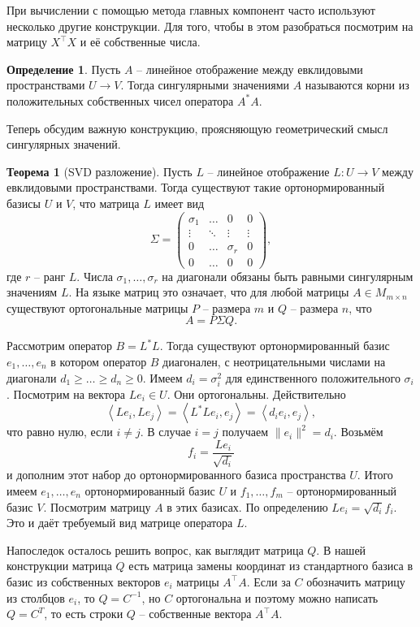 \documentclass[10pt,a4paper,oneside]{book}
\theoremstyle{definition}
\newtheorem*{defn}{\color{yellow!30!red} Определение}
\newtheorem{thm}{\color{red!40!black}Теорема}
\renewcommand{\geq}{\geqslant}
\def\lan{\left\langle }
\def\ran{\right\rangle}
\def\thrm{\begin{thm}}
\def\ethrm{\end{thm}}
\def\dfn{\begin{defn}}
\def\edfn{\end{defn}}
\def\pmat{\begin{pmatrix}}
\def\epmat{\end{pmatrix}}
\begin{document}
При вычислении с помощью метода главных компонент часто используют несколько другие конструкции. Для того, чтобы в этом разобраться посмотрим на матрицу  $X^{\top}X$  и её собственные числа.  

\dfn Пусть $A$ -- линейное отображение между евклидовыми пространствами $U \to V$. Тогда сингулярными значениями $A$ называются корни из положительных собственных чисел оператора $A^*A$.
\edfn



Теперь обсудим важную конструкцию, проясняющую геометрический смысл сингулярных значений.


\thrm[SVD разложение] Пусть $L$ -- линейное отображение $L\colon U \to V$ между евклидовыми пространствами. Тогда существуют такие ортонормированный базисы $U$ и $V$, что матрица $L$ имеет вид 
$$\Sigma=\pmat \sigma_1 &\dots& 0 & 0\\
 \vdots & \ddots &\vdots & \vdots\\
 0 & \dots & \sigma_r & 0\\
 0 &  \dots & 0 & 0 \epmat,$$
 где $r$ -- ранг $L$. Числа $\sigma_1, \dots, \sigma_r$ на диагонали обязаны быть равными сингулярным значениям $L$.
На языке матриц это означает, что для любой матрицы $A \in M_{m\times n}$ существуют ортогональные матрицы  $P$ -- размера $m$ и $Q$ -- размера $n$,  что
$$A= P \Sigma Q.$$
 
\proof Рассмотрим оператор $B = L^{*}L$. Тогда существуют ортонормированный базис $e_1,\dots,e_n$ в котором оператор $B$ диагонален, с неотрицательными числами на диагонали $d_1\geq\dots\geq d_n\geq 0$. Имеем  $d_i=\sigma_i^2$ для единственного положительного $\sigma_i$. 
Посмотрим на вектора $Le_i \in U$. Они ортогональны. Действительно
$$\lan Le_i, Le_j\ran = \lan L^{*}Le_i,e_j \ran = \lan d_i e_i,e_j\ran,$$
что равно нулю, если $i\neq j$. В случае $i=j$ получаем $\|e_i\|^2=d_i$. Возьмём 
$$f_i=\frac{Le_i}{\sqrt{d_i}}$$
и дополним этот набор до ортонормированного базиса пространства $U$. Итого имеем $e_1,\dots,e_n$ ортонормированный базис $U$ и $f_1,\dots,f_m$ -- ортонормированный базис $V$.
Посмотрим матрицу $A$ в этих базисах. По определению $Le_i=\sqrt{d_i}f_i$. Это и даёт требуемый вид матрице оператора $L$.


Напоследок осталось решить вопрос, как выглядит матрица $Q$. В нашей конструкции матрица $Q$ есть матрица замены координат из стандартного базиса в базис из собственных векторов $e_i$ матрицы $A^{\top}A$. Если за $C$ обозначить матрицу из столбцов $e_i$, то $Q=C^{-1}$, но $C$ ортогональна и поэтому можно написать $Q=C^{T}$, то есть строки $Q$ -- собственные вектора $A^{\top}A$.
\endproof
\ethrm
\end{document}
